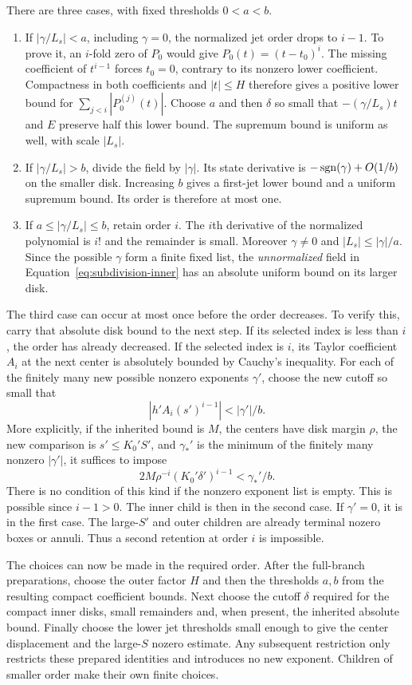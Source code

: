There are three cases, with fixed thresholds $0<a<b$.
\begin{enumerate}
\item If $|\gamma/L_s|<a$, including $\gamma=0$, the normalized jet
order drops to $i-1$.  To prove it, an $i$-fold zero of $P_0$ would give
$P_0(t)=(t-t_0)^i$.  The missing coefficient of $t^{i-1}$ forces
$t_0=0$, contrary to its nonzero lower coefficient.  Compactness in
both coefficients and $|t|\le H$ therefore gives a positive lower bound
for $\sum_{j<i}|P_0^{(j)}(t)|$.  Choose $a$ and then $\delta$ so small
that $-(\gamma/L_s)t$ and $E$ preserve half this lower bound.  The
supremum bound is uniform as well, with scale $|L_s|$.
\item If $|\gamma/L_s|>b$, divide the field by $|\gamma|$.  Its state
derivative is $-\operatorname{sgn}(\gamma)+O(1/b)$ on the smaller disk.  Increasing
$b$ gives a first-jet lower bound and a uniform supremum bound.  Its
order is therefore at most one.
\item If $a\le|\gamma/L_s|\le b$, retain order $i$.  The $i$th
derivative of the normalized polynomial is $i!$ and the remainder is
small.  Moreover $\gamma\ne0$ and $|L_s|\le|\gamma|/a$.  Since the
possible $\gamma$ form a finite fixed list, the \emph{unnormalized}
field in Equation~\eqref{eq:subdivision-inner} has an absolute uniform
bound on its larger disk.
\end{enumerate}

The third case can occur at most once before the order decreases.
To verify this, carry that absolute disk bound to the next step.  If
its selected index is less than $i$, the order has already decreased.
If the selected index is $i$, its Taylor coefficient $A_i$ at the next
center is absolutely bounded by Cauchy's inequality.  For each of the
finitely many new possible nonzero exponents $\gamma'$, choose the new
cutoff so small that
\[
 |h'A_i(s')^{i-1}|<|\gamma'|/b.
\]
More explicitly, if the inherited bound is $M$, the centers have disk
margin $\rho$, the new comparison is $s'\le K_0'S'$, and
$\gamma_*'$ is the minimum of the finitely many nonzero
$|\gamma'|$, it suffices to impose
\[
 2M\rho^{-i}(K_0'\delta')^{i-1}<\gamma_*'/b.
\]
There is no condition of this kind if the nonzero exponent list is
empty.  This is possible since $i-1>0$.  The inner child is
then in the second case.  If $\gamma'=0$, it is in the first case.
The large-$S'$ and outer children are already terminal nozero boxes or
annuli.  Thus a second retention at order $i$ is impossible.

The choices can now be made in the required order.  After the full-branch
preparations, choose the outer factor $H$ and then the thresholds $a,b$
from the resulting compact coefficient bounds.  Next choose the cutoff
$\delta$ required for the compact inner disks, small remainders and,
when present, the inherited absolute bound.  Finally choose the lower
jet thresholds small enough to give the center displacement and the
large-$S$ nozero estimate.  Any subsequent restriction only restricts
these prepared identities and introduces no new exponent.  Children of
smaller order make their own finite choices.

